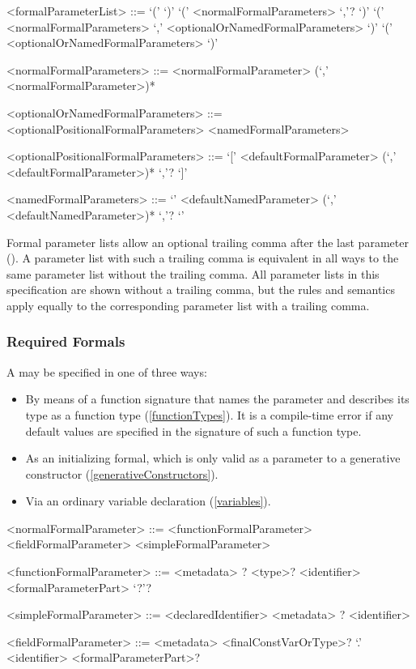 \documentclass[makeidx]{article}
\begin{document}
\begin{grammar}
<formalParameterList> ::= `(' `)'
  \alt `(' <normalFormalParameters> `,'? `)'
  \alt `(' <normalFormalParameters> `,' <optionalOrNamedFormalParameters> `)'
  \alt `(' <optionalOrNamedFormalParameters> `)'

<normalFormalParameters> ::= \gnewline{}
  <normalFormalParameter> (`,' <normalFormalParameter>)*

<optionalOrNamedFormalParameters> ::= <optionalPositionalFormalParameters>
  \alt <namedFormalParameters>

<optionalPositionalFormalParameters> ::= \gnewline{}
  `[' <defaultFormalParameter> (`,' <defaultFormalParameter>)* `,'? `]'

<namedFormalParameters> ::= \gnewline{}
  `{' <defaultNamedParameter> (`,' <defaultNamedParameter>)* `,'? `}'
\end{grammar}

Formal parameter lists allow an optional trailing comma after the last parameter ().
A parameter list with such a trailing comma is equivalent in all ways to the same parameter list without the trailing comma.
All parameter lists in this specification are shown without a trailing comma, but the rules and semantics apply equally to the corresponding parameter list with a trailing comma.


\subsubsection{Required Formals}

\LMHash{}%
A  may be specified in one of three ways:
\begin{itemize}
\item By means of a function signature that names the parameter and describes its type as a function type (\ref{functionTypes}).
It is a compile-time error if any default values are specified in the signature of such a function type.%
\item As an initializing formal, which is only valid as a parameter to a generative constructor (\ref{generativeConstructors}). %
\item Via an ordinary variable declaration (\ref{variables}).
\end{itemize}

\begin{grammar}
<normalFormalParameter> ::= <functionFormalParameter>
  \alt <fieldFormalParameter>
  \alt <simpleFormalParameter>

<functionFormalParameter> ::= \gnewline{}
  <metadata> \COVARIANT{}? <type>? <identifier> <formalParameterPart> `?'?

<simpleFormalParameter> ::= <declaredIdentifier>
  \alt <metadata> \COVARIANT{}? <identifier>

<fieldFormalParameter> ::= \gnewline{}
  <metadata> <finalConstVarOrType>? \THIS{} `.' <identifier> \gnewline{}
  <formalParameterPart>?
\end{grammar}
\end{document}
